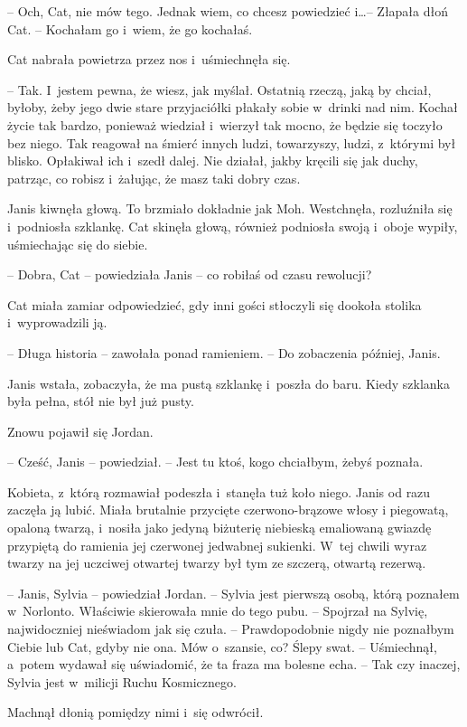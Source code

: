 \documentclass[oneside,polish,11pt,sfheadings]{mwbk}
\begin{document}
-- Och, Cat, nie mów tego. Jednak wiem, co chcesz powiedzieć i\ldots -- Złapała dłoń Cat. -- Kochałam go i~wiem, że go kochałaś.

Cat nabrała powietrza przez nos i~uśmiechnęła się. 

-- Tak. I~jestem
pewna, że wiesz, jak myślał. Ostatnią rzeczą, jaką by chciał, byłoby,
żeby jego dwie stare przyjaciółki płakały sobie w~drinki nad nim. Kochał
życie tak bardzo, ponieważ wiedział i~wierzył tak mocno, że będzie się
toczyło bez niego. Tak reagował na śmierć innych ludzi, towarzyszy,
ludzi, z~którymi był blisko. Opłakiwał ich i~szedł dalej. Nie działał,
jakby kręcili się jak duchy, patrząc, co robisz i~żałując, że masz taki
dobry czas.

Janis kiwnęła głową. To brzmiało dokładnie jak Moh. Westchnęła,
rozluźniła się i~podniosła szklankę. Cat skinęła głową, również
podniosła swoją i~oboje wypiły, uśmiechając się do siebie.

-- Dobra, Cat -- powiedziała Janis -- co robiłaś od czasu rewolucji?

Cat miała zamiar odpowiedzieć, gdy inni gości stłoczyli się dookoła
stolika i~wyprowadzili ją. 

-- Długa historia -- zawołała ponad ramieniem.
-- Do zobaczenia później, Janis.

Janis wstała, zobaczyła, że ma pustą szklankę i~poszła do baru. Kiedy
szklanka była pełna, stół nie był już pusty.

Znowu pojawił się Jordan.

-- Cześć, Janis -- powiedział. -- Jest tu ktoś, kogo chciałbym, żebyś
poznała.

Kobieta, z~którą rozmawiał podeszła i~stanęła tuż koło niego. Janis od
razu zaczęła ją lubić. Miała brutalnie przycięte czerwono-brązowe włosy
i piegowatą, opaloną twarzą, i~nosiła jako jedyną biżuterię niebieską
emaliowaną gwiazdę przypiętą do ramienia jej czerwonej jedwabnej
sukienki. W~tej chwili wyraz twarzy na jej uczciwej otwartej twarzy był
tym ze szczerą, otwartą rezerwą.

-- Janis, Sylvia -- powiedział Jordan. -- Sylvia jest pierwszą osobą, którą
poznałem w~Norlonto. Właściwie skierowała mnie do tego pubu. -- Spojrzał
na Sylvię, najwidoczniej nieświadom jak się czuła. -- Prawdopodobnie
nigdy nie poznałbym Ciebie lub Cat, gdyby nie ona. Mów o~szansie, co?
Ślepy swat. -- Uśmiechnął, a~potem wydawał się uświadomić, że ta fraza ma
bolesne echa. -- Tak czy inaczej, Sylvia jest w~milicji Ruchu
Kosmicznego.

Machnął dłonią pomiędzy nimi i~się odwrócił.
\end{document}
